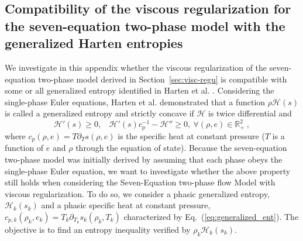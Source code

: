 \documentclass[preprint,10pt]{elsarticle}
\newcommand{\eqt}[1]{Eq.~(\ref{#1})}                     %
\newcommand{\sct}[1]{Section~\ref{#1}}                   %
\begin{document}
\begin{appendices}
\section{Compatibility of the viscous regularization for the seven-equation two-phase model with the generalized Harten entropies}\label{app:harden}
We investigate in this appendix whether the viscous regularization of the seven-equation two-phase model derived in \sct{sec:visc-regu} is compatible with some or all generalized entropy identified in Harten et al. \cite{Harten}. Considering the single-phase Euler equations, Harten et al. \cite{Harten} demonstrated that a function $\rho \mathscr{H}(s)$ is called a generalized entropy and strictly concave if $\mathscr{H}$ is twice differential and
%
\begin{equation}\label{eq:generalized_ent}
\mathscr{H}' (s)  \geq 0, \ \ \ \ \mathscr{H}'(s)c_p^{-1} - \mathscr{H}'' \geq 0, \ \forall \left( \rho, e \right) \in \mathbb{R}_+^2 \ ,
\end{equation}
%
where $c_p \left( \rho, e \right) = T \partial_T s \left( \rho, e \right)$ is the specific heat at constant pressure ($T$ is a function of $e$ and $\rho$ through the equation of state). Because the seven-equation two-phase model was initially derived by assuming that each phase obeys the single-phase Euler equation, we want to investigate whether the above property still holds when considering the Seven-Equation two-phase flow Model with viscous regularization. To do so, we consider a phasic generalized entropy, $\mathscr{H}_k(s_k)$ and a phasic specific heat at constant pressure, $c_{p,k} \left( \rho_k, e_k \right) = T_k \partial_{T_k} s_k \left( \rho_k, T_k \right)$ characterized by \eqt{eq:generalized_ent}. The objective is to find an entropy inequality verified by $\rho_k \mathscr{H}_k(s_k)$.


\end{appendices}
\end{document}
